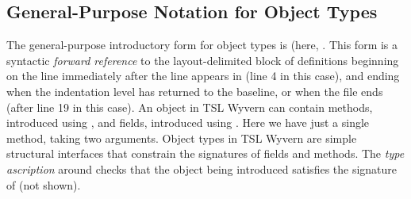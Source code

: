 \subsection{General-Purpose Notation for Object Types}
The general-purpose introductory form for object types is  (here, . This form is a syntactic \emph{forward reference} to the layout-delimited block of {definitions} beginning on the line immediately after the line  appears in (line 4 in this case), and ending when the indentation level has returned to the baseline, or when the file ends (after line 19 in this case). An object in TSL Wyvern can contain methods, introduced using , and fields, introduced using . Here we have just a single method,  taking two arguments. Object types in TSL Wyvern are simple structural interfaces that constrain the signatures of fields and methods. The \emph{type ascription} around  checks that the object being introduced satisfies the signature of  (not shown).
